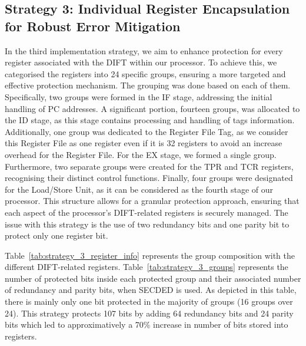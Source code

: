 \subsection{Strategy 3: Individual Register Encapsulation for Robust Error Mitigation}

In the third implementation strategy, we aim to enhance protection for every register associated with the DIFT within our processor. To achieve this, we categorised the registers into 24 specific groups, ensuring a more targeted and effective protection mechanism. The grouping was done based on each of them. Specifically, two groups were formed in the IF stage, addressing the initial handling of PC addresses. A significant portion, fourteen groups, was allocated to the ID stage, as this stage contains processing and handling of tags information. Additionally, one group was dedicated to the Register File Tag, as we consider this Register File as one register even if it is 32 registers to avoid an increase overhead for the Register File. For the EX stage, we formed a single group. Furthermore, two separate groups were created for the TPR and TCR registers, recognising their distinct control functions. Finally, four groups were designated for the Load/Store Unit, as it can be considered as the fourth stage of our processor. This structure allows for a granular protection approach, ensuring that each aspect of the processor's DIFT-related registers is securely managed. The issue with this strategy is the use of two redundancy bits and one parity bit to protect only one register bit.

Table~\ref{tab:strategy_3_register_info} represents the group composition with the different DIFT-related registers.
Table~\ref{tab:strategy_3_groups} represents the number of protected bits inside each protected group and their associated number of redundancy and parity bits, when SECDED is used. As depicted in this table, there is mainly only one bit protected in the majority of groups (16 groups over 24). This strategy protects 107 bits by adding 64 redundancy bits and 24 parity bits which led to approximatively a 70\% increase in number of bits stored into registers.

